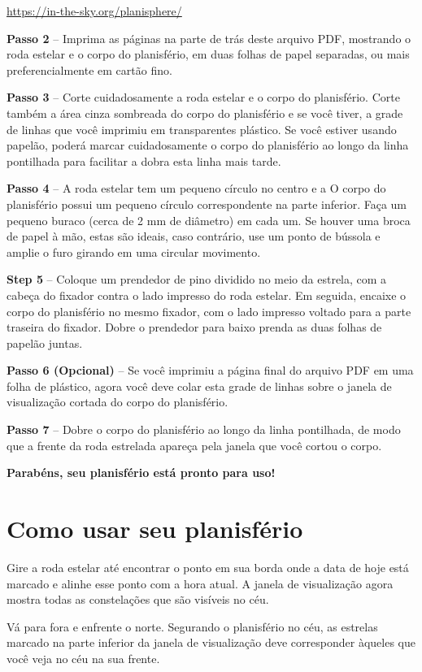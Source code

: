 \documentclass[a4paper,onecolumn,10pt]{article}
\begin{document}
\url{https://in-the-sky.org/planisphere/}

{\bf Passo 2} -- Imprima as páginas na parte de trás deste arquivo PDF, mostrando o
roda estelar e o corpo do planisfério, em duas folhas de papel separadas,
ou mais preferencialmente em cartão fino.

{\bf Passo 3} -- Corte cuidadosamente a roda estelar e o corpo do
planisfério. Corte também a área cinza sombreada do corpo do planisfério e
se você tiver, a grade de linhas que você imprimiu em transparentes
plástico. Se você estiver usando papelão, poderá marcar cuidadosamente o corpo
do planisfério ao longo da linha pontilhada para facilitar a dobra
esta linha mais tarde.

{\bf Passo 4} -- A roda estelar tem um pequeno círculo no centro e a
O corpo do planisfério possui um pequeno círculo correspondente na parte inferior. 
Faça um pequeno buraco (cerca de 2 mm de diâmetro) em cada um. Se houver uma broca 
de papel à mão, estas são ideais, caso contrário, use um ponto de bússola e 
amplie o furo girando em uma circular movimento.

{\bf Step 5} -- Coloque um prendedor de pino dividido no meio da
estrela, com a cabeça do fixador contra o lado impresso do roda estelar. 
Em seguida, encaixe o corpo do planisfério no mesmo fixador, com o lado 
impresso voltado para a parte traseira do fixador. Dobre o prendedor para 
baixo prenda as duas folhas de papelão juntas.

{\bf Passo 6 (Opcional)} -- Se você imprimiu a página final do arquivo PDF
em uma folha de plástico, agora você deve colar esta grade de linhas sobre o
janela de visualização cortada do corpo do planisfério.

{\bf Passo 7} -- Dobre o corpo do planisfério ao longo da linha pontilhada, 
de modo que a frente da roda estrelada apareça pela janela que você cortou
o corpo.

{\bf Parabéns, seu planisfério está pronto para uso!}

\section*{Como usar seu planisfério}

Gire a roda estelar até encontrar o ponto em sua borda onde a data de hoje
está marcado e alinhe esse ponto com a hora atual. A janela de visualização agora
mostra todas as constelações que são visíveis no céu.

Vá para fora e enfrente o norte. Segurando o planisfério no céu, as estrelas
marcado na parte inferior da janela de visualização deve corresponder àqueles que 
você veja no céu na sua frente.
\end{document}
